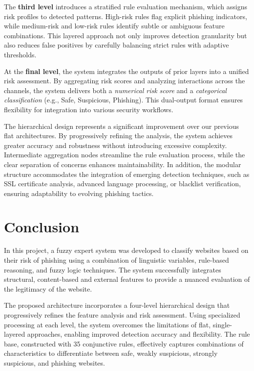 \documentclass{article}
\begin{document}
The \textbf{third level} introduces a stratified rule evaluation mechanism, which assigns risk profiles to detected patterns. High-risk rules flag explicit phishing indicators, while medium-risk and low-risk rules identify subtle or ambiguous feature combinations. This layered approach not only improves detection granularity but also reduces false positives by carefully balancing strict rules with adaptive thresholds.

At the \textbf{final level}, the system integrates the outputs of prior layers into a unified risk assessment. By aggregating risk scores and analyzing interactions across the channels, the system delivers both a \textit{numerical risk score} and a \textit{categorical classification} (e.g., Safe, Suspicious, Phishing). This dual-output format ensures flexibility for integration into various security workflows.

The hierarchical design represents a significant improvement over our previous flat architectures. By progressively refining the analysis, the system achieves greater accuracy and robustness without introducing excessive complexity. Intermediate aggregation nodes streamline the rule evaluation process, while the clear separation of concerns enhances maintainability. In addition, the modular structure accommodates the integration of emerging detection techniques, such as SSL certificate analysis, advanced language processing, or blacklist verification, ensuring adaptability to evolving phishing tactics.

\section{Conclusion}

In this project, a fuzzy expert system was developed to classify websites based on their risk of phishing using a combination of linguistic variables, rule-based reasoning, and fuzzy logic techniques. The system successfully integrates structural, content-based and external features to provide a nuanced evaluation of the legitimacy of the website.

The proposed architecture incorporates a four-level hierarchical design that progressively refines the feature analysis and risk assessment. Using specialized processing at each level, the system overcomes the limitations of flat, single-layered approaches, enabling improved detection accuracy and flexibility. The rule base, constructed with 35 conjunctive rules, effectively captures combinations of characteristics to differentiate between safe, weakly suspicious, strongly suspicious, and phishing websites.
\end{document}
